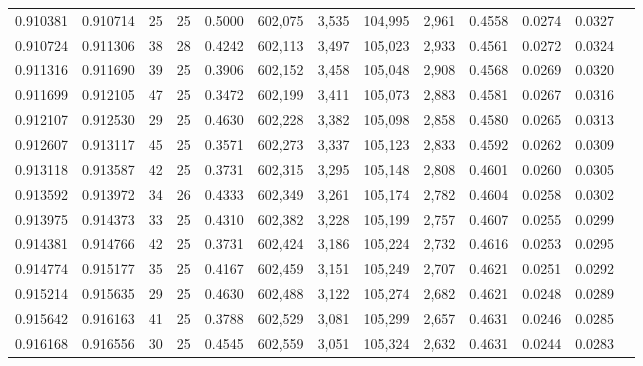 \begin{tabular}{rrrrrrrrrrrrr}
0.910381 & 0.910714 &    25 &  25 &                                     0.5000 & 602,075 &   3,535 & 104,995 &   2,961 & 0.4558 & 0.0274 & 0.0327 \\
0.910724 & 0.911306 &    38 &  28 &                                     0.4242 & 602,113 &   3,497 & 105,023 &   2,933 & 0.4561 & 0.0272 & 0.0324 \\
0.911316 & 0.911690 &    39 &  25 &                                     0.3906 & 602,152 &   3,458 & 105,048 &   2,908 & 0.4568 & 0.0269 & 0.0320 \\
0.911699 & 0.912105 &    47 &  25 &                                     0.3472 & 602,199 &   3,411 & 105,073 &   2,883 & 0.4581 & 0.0267 & 0.0316 \\
0.912107 & 0.912530 &    29 &  25 &                                     0.4630 & 602,228 &   3,382 & 105,098 &   2,858 & 0.4580 & 0.0265 & 0.0313 \\
0.912607 & 0.913117 &    45 &  25 &                                     0.3571 & 602,273 &   3,337 & 105,123 &   2,833 & 0.4592 & 0.0262 & 0.0309 \\
0.913118 & 0.913587 &    42 &  25 &                                     0.3731 & 602,315 &   3,295 & 105,148 &   2,808 & 0.4601 & 0.0260 & 0.0305 \\
0.913592 & 0.913972 &    34 &  26 &                                     0.4333 & 602,349 &   3,261 & 105,174 &   2,782 & 0.4604 & 0.0258 & 0.0302 \\
0.913975 & 0.914373 &    33 &  25 &                                     0.4310 & 602,382 &   3,228 & 105,199 &   2,757 & 0.4607 & 0.0255 & 0.0299 \\
0.914381 & 0.914766 &    42 &  25 &                                     0.3731 & 602,424 &   3,186 & 105,224 &   2,732 & 0.4616 & 0.0253 & 0.0295 \\
0.914774 & 0.915177 &    35 &  25 &                                     0.4167 & 602,459 &   3,151 & 105,249 &   2,707 & 0.4621 & 0.0251 & 0.0292 \\
0.915214 & 0.915635 &    29 &  25 &                                     0.4630 & 602,488 &   3,122 & 105,274 &   2,682 & 0.4621 & 0.0248 & 0.0289 \\
0.915642 & 0.916163 &    41 &  25 &                                     0.3788 & 602,529 &   3,081 & 105,299 &   2,657 & 0.4631 & 0.0246 & 0.0285 \\
0.916168 & 0.916556 &    30 &  25 &                                     0.4545 & 602,559 &   3,051 & 105,324 &   2,632 & 0.4631 & 0.0244 & 0.0283 \\

\end{tabular}

